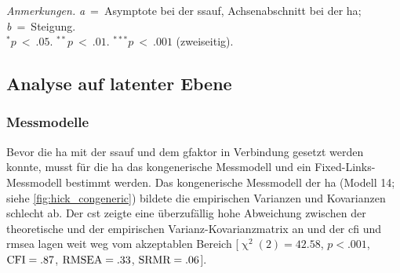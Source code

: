 \documentclass[11pt, twoside, a4paper]{book}		%
\begin{document}
\begin{table}[htbp]
\begin{adjustbox}{width=1\textwidth}
\begin{threeparttable}
\begin{tabular}
			\hline
			
		\end{tabular}%
		\begin{tablenotes}[flushleft]
			\footnotesize				%
			\setlength{}	%
			\item \textit{Anmerkungen.} \textit{a}~=~Asymptote bei der \gls{ssauf}, Achsenabschnitt bei der \gls{ha}; \textit{b}~=~Steigung. \\
			$^{*}p~<~.05$. $^{**}p~<~.01$. $^{***}p~<~.001$ (zweiseitig).
		\end{tablenotes}%
	\end{threeparttable}%
\end{adjustbox}
\end{table}

\clearpage
\subsection{Analyse auf latenter Ebene}

\subsubsection*{Messmodelle}

Bevor die \gls{ha} mit der \gls{ssauf} und dem \gls{gfaktor} in Verbindung gesetzt werden konnte, musst für die \gls{ha} das kongenerische Messmodell und ein Fixed-Links-Messmodell bestimmt werden. Das kongenerische Messmodell der \gls{ha} (Modell 14; siehe \autoref{fig:hick_congeneric}) bildete die empirischen Varianzen und Kovarianzen schlecht ab.  Der \gls{cst} zeigte eine überzufällig hohe Abweichung zwischen der theoretische und der empirischen Var\-ianz-Ko\-var\-ianz\-ma\-trix an und der \gls{cfi} und \gls{rmsea} lagen weit weg vom akzeptablen Bereich [$\upchi^2(2)=42.58$, $p<.001$, $\textnormal{CFI}=.87$, $\textnormal{RMSEA}=.33$, $\textnormal{SRMR}=.06$].
\end{document}
